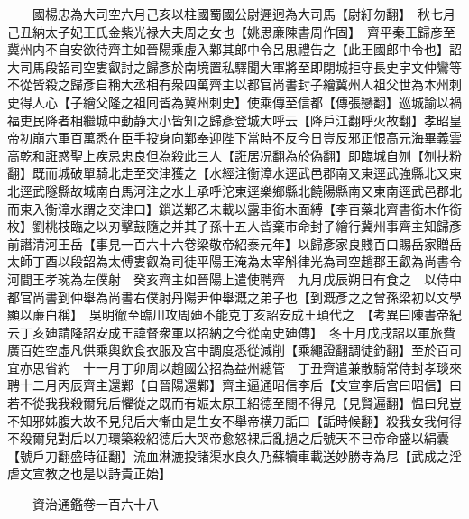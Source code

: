 　　國楊忠為大司空六月己亥以柱國蜀國公尉遲迥為大司馬【尉紆勿翻】　秋七月己丑納太子妃王氏金紫光禄大夫周之女也【姚思亷陳書周作固】　齊平秦王歸彦至冀州内不自安欲待齊主如晉陽乘虛入鄴其郎中令呂思禮告之【此王國郎中令也】詔大司馬段韶司空婁叡討之歸彥於南境置私驛聞大軍將至即閉城拒守長史宇文仲鸞等不從皆殺之歸彥自稱大丞相有衆四萬齊主以都官尚書封子繪冀州人祖父世為本州刺史得人心【子繪父隆之祖囘皆為冀州刺史】使乘傳至信都【傳張戀翻】巡城諭以禍福吏民降者相繼城中動静大小皆知之歸彥登城大呼云【降戶江翻呼火故翻】孝昭皇帝初崩六軍百萬悉在臣手投身向鄴奉迎陛下當時不反今日豈反邪正恨高元海畢義雲高乾和誑惑聖上疾忌忠良但為殺此三人【誑居况翻為於偽翻】即臨城自刎【刎扶粉翻】既而城破單騎北走至交津獲之【水經注衡漳水逕武邑郡南又東逕武強縣北又東北逕武隧縣故城南白馬河注之水上承呼沱東逕樂鄉縣北饒陽縣南又東南逕武邑郡北而東入衡漳水謂之交津口】鎻送鄴乙未載以露車銜木面縛【李百藥北齊書銜木作銜枚】劉桃枝臨之以刃擊鼓隨之并其子孫十五人皆棄市命封子繪行冀州事齊主知歸彥前譖清河王岳【事見一百六十六卷梁敬帝紹泰元年】以歸彥家良賤百口賜岳家贈岳太師丁酉以段韶為太傅婁叡為司徒平陽王淹為太宰斛律光為司空趙郡王叡為尚書令河間王孝琬為左僕射　癸亥齊主如晉陽上遣使聘齊　九月戊辰朔日有食之　以侍中都官尚書到仲舉為尚書右僕射丹陽尹仲舉溉之弟子也【到溉彥之之曾孫梁初以文學顯以亷白稱】　吳明徹至臨川攻周廸不能克丁亥詔安成王頊代之　【考異曰陳書帝紀云丁亥廸請降詔安成王諱督衆軍以招納之今從南史廸傳】　冬十月戊戌詔以軍旅費廣百姓空虛凡供乘輿飲食衣服及宫中調度悉從減削【乘繩證翻調徒釣翻】至於百司宜亦思省約　十一月丁卯周以趙國公招為益州總管　丁丑齊遣兼散騎常侍封孝琰來聘十二月丙辰齊主還鄴【自晉陽還鄴】齊主逼通昭信李后【文宣李后宫曰昭信】曰若不從我我殺爾兒后懼從之既而有娠太原王紹德至閤不得見【見賢遍翻】愠曰兒豈不知邪姊腹大故不見兒后大慚由是生女不舉帝横刀詬曰【詬時候翻】殺我女我何得不殺爾兒對后以刀環築殺紹德后大哭帝愈怒裸后亂撾之后號天不已帝命盛以絹囊【號戶刀翻盛時征翻】流血淋漉投諸渠水良久乃蘇犢車載送妙勝寺為尼【武成之淫虐文宣教之也是以詩貴正始】

　　資治通鑑卷一百六十八


    


 


 



 

 
  







 


　　
　　
　
　
　


　　


